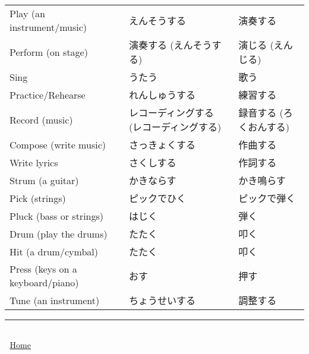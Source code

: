 \documentclass[11pt]{article}
\begin{document}
\begin{center}
\begin{tabular}{lll}
Play (an instrument/music) & えんそうする & 演奏する\\[0pt]
Perform (on stage) & 演奏する (えんそうする) & 演じる (えんじる)\\[0pt]
Sing & うたう & 歌う\\[0pt]
Practice/Rehearse & れんしゅうする & 練習する\\[0pt]
Record (music) & レコーディングする (レコーディングする) & 録音する (ろくおんする)\\[0pt]
Compose (write music) & さっきょくする & 作曲する\\[0pt]
Write lyrics & さくしする & 作詞する\\[0pt]
Strum (a guitar) & かきならす & かき鳴らす\\[0pt]
Pick (strings) & ピックでひく & ピックで弾く\\[0pt]
Pluck (bass or strings) & はじく & 弾く\\[0pt]
Drum (play the drums) & たたく & 叩く\\[0pt]
Hit (a drum/cymbal) & たたく & 叩く\\[0pt]
Press (keys on a keyboard/piano) & おす & 押す\\[0pt]
Tune (an instrument) & ちょうせいする & 調整する\\[0pt]
\end{tabular}
\end{center}



\noindent\rule{\textwidth}{0.5pt}
\begin{HTML}
\begin{center}
\begin{tabular}{}
\\[0pt]
\end{tabular}
\end{center}
🔗 \href{https://sendagirich.github.io/asuka/vl\_index.html}{Home}
\end{HTML}
\end{document}
